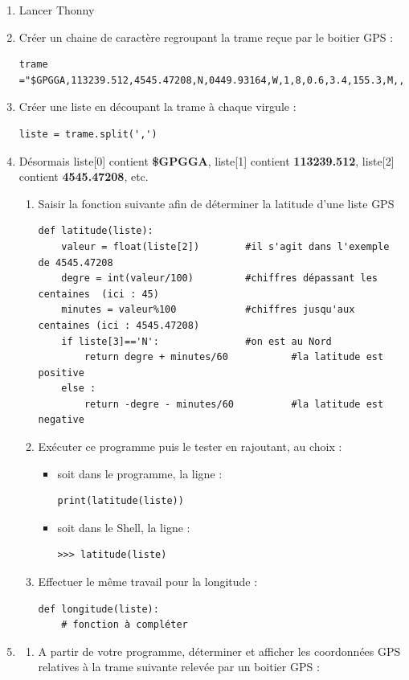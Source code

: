 \documentclass[a4paper,10pt]{article}
\begin{document}
\begin{enumerate}
\item Lancer Thonny 
\item Créer un chaine de caractère regroupant la trame reçue par le boitier GPS :
\begin{lstlisting}
trame ="$GPGGA,113239.512,4545.47208,N,0449.93164,W,1,8,0.6,3.4,155.3,M,,,*4A"
\end{lstlisting}
\item Créer une liste en découpant la trame à chaque virgule : 
\begin{lstlisting}
liste = trame.split(',')
\end{lstlisting}
\item Désormais liste[0] contient \textbf{ \$GPGGA}, \quad liste[1] contient  \textbf{113239.512}, \quad liste[2] contient \textbf{4545.47208},  etc.
\begin{enumerate}
\item Saisir la fonction suivante afin de déterminer la latitude d'une liste GPS
\begin{lstlisting}
def latitude(liste):
	valeur = float(liste[2])  		#il s'agit dans l'exemple de 4545.47208
	degre = int(valeur/100)			#chiffres dépassant les centaines  (ici : 45)
	minutes = valeur%100  			#chiffres jusqu'aux centaines (ici : 4545.47208)
	if liste[3]=='N':				#on est au Nord 
	 	return degre + minutes/60    		#la latitude est positive
	else : 
	 	return -degre - minutes/60 			#la latitude est negative
     \end{lstlisting}

\item Exécuter ce programme puis le tester en rajoutant, au choix :
\begin{itemize} 
\item soit dans   le programme, la ligne :
\begin{lstlisting}
print(latitude(liste))
 \end{lstlisting}
 \item soit  dans le Shell, la ligne :
 \begin{lstlisting}
>>> latitude(liste)
 \end{lstlisting}
 \end{itemize}
 
 \item Effectuer le même travail pour la longitude :
 \begin{lstlisting}
def longitude(liste):
	# fonction à compléter

     \end{lstlisting}
\end{enumerate}
\item 
\begin{enumerate}
\item A partir de votre programme, déterminer et afficher les coordonnées GPS relatives à la trame suivante relevée par un boitier GPS :


\end{enumerate}
\end{enumerate}
\end{document}
